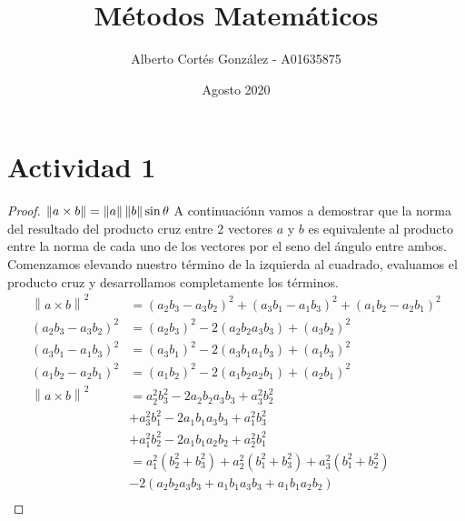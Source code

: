 \documentclass{article}
\title{Métodos Matemáticos}
\author{Alberto Cortés González - A01635875}
\date{Agosto 2020}
\newcommand{\norm}[1]{\left\lVert#1\right\rVert}
\begin{document}
\maketitle

\section{Actividad 1}
\begin{proof}
$\norm{a\times b} = \norm{a}\norm{b}\sin\theta \\$
A continuaciónn vamos a demostrar que la norma del resultado del producto cruz entre 2 vectores $a$ y $b$ es equivalente al producto entre la norma de cada uno de los vectores por el seno del ángulo entre ambos.\\

Comenzamos elevando nuestro término de la izquierda al cuadrado, evaluamos el producto cruz y desarrollamos completamente los términos.
\begin{equation*}
    \begin{split}
        \norm{a\times b}^2  &= (a_{2}b_{3} - a_{3}b_{2})^2 + (a_{3}b_{1} - a_{1}b_{3})^2 + (a_{1}b_{2} - a_{2}b_{1})^2\\
        (a_{2}b_{3} - a_{3}b_{2})^2 &= (a_{2}b_{3})^2 - 2(a_{2}b_{2}a_{3}b_{3}) + (a_{3}b_{2})^2 \\
        (a_{3}b_{1} - a_{1}b_{3})^2 &= (a_{3}b_{1})^2 - 2(a_{3}b_{1}a_{1}b_{3}) + (a_{1}b_{3})^2 \\
        (a_{1}b_{2} - a_{2}b_{1})^2 &= (a_{1}b_{2})^2 - 2(a_{1}b_{2}a_{2}b_{1}) + (a_{2}b_{1})^2 \\
        \norm{a\times b}^2  &= a_{2}^2b_{3}^2 - 2a_{2}b_{2}a_{3}b_{3} + a_{3}^2b_{2}^2 \\
        &+ a_{3}^2b_{1}^2 - 2a_{1}b_{1}a_{3}b_{3} + a_{1}^2b_{3}^2 \\
        &+ a_{1}^2b_{2}^2 - 2a_{1}b_{1}a_{2}b_{2} + a_{2}^2b_{1}^2 \\
        &= a_{1}^2(b_{2}^2+b_{3}^2)+a_{2}^2(b_{1}^2+b_{3}^2)+a_{3}^2(b_{1}^2+b_{2}^2)\\
        &- 2(a_{2}b_{2}a_{3}b_{3}+a_{1}b_{1}a_{3}b_{3}+a_{1}b_{1}a_{2}b_{2}) \\
    \end{split}
\end{equation*}


\end{proof}
\end{document}
